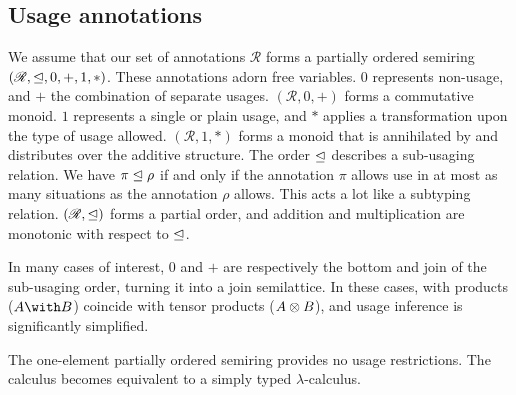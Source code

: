 \subsection{Usage annotations}
\label{sec:annotations}


We assume that our set of annotations $\mathscr R$ forms a partially ordered
semiring $(\mathscr{R}, \trianglelefteq, 0, +, 1, *)$.
These annotations adorn free variables.
$0$ represents non-usage, and $+$ the combination of separate usages.
$(\mathscr{R}, 0, +)$ forms a commutative monoid.
$1$ represents a single or plain usage, and $*$ applies a transformation upon
the type of usage allowed.
$(\mathscr{R}, 1, *)$ forms a monoid that is annihilated by and distributes over
the additive structure.
The order $\trianglelefteq$ describes a sub-usaging relation.
We have $\pi \trianglelefteq \rho$ if and only if the annotation $\pi$ allows use in at
most as many situations as the annotation $\rho$ allows.
This acts a lot like a subtyping relation.
$(\mathscr{R}, \trianglelefteq)$ forms a partial order, and addition and multiplication
are monotonic with respect to $\trianglelefteq$.

In many cases of interest, $0$ and $+$ are respectively the bottom and join of
the sub-usaging order, turning it into a join semilattice.
In these cases, with products ($\withT{A}{B}$) coincide with tensor products
($A \otimes B$), and usage inference is significantly simplified.
 


\begin{example}[Trivial]
  The one-element partially ordered semiring provides no usage restrictions.
  The calculus becomes equivalent to a simply typed $\lambda$-calculus.
\end{example}

